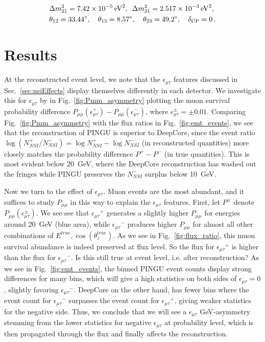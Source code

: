 \documentclass[draft=True]{revtex4-2}
\newcommand{\ztrue}{\ensuremath{\cos{(\theta_z^{true})}}}
\newcommand{\emt}{\ensuremath{\epsilon_{\mu\tau}}}
\newcommand{\Etrue}{E^{true}}
\newcommand{\dm}{\Delta m^2_{31}}
\begin{document}
\begin{align}\label{eq:PINGUparams}
    &\Delta m^2_{21} =  \SI{7.42e-5}{\electronvolt^2},\hspace{0.5em} \dm =  \SI{2.517e-3}{\electronvolt^2}, \nonumber \\
    &\theta_{12} = \SI{33.44}{\degree},\hspace{1em} \theta_{13} = \SI{8.57}{\degree},\hspace{1em} \theta_{23} = \SI{49.2}{\degree}, \hspace{1em} \delta_\text{CP} = 0\,.
\end{align}

\section{Results}
At the reconstructed event level, we note that the $\emt$ features discussed in Sec.~\ref{sec:nsiEffects} display themselves differently in each detector.
We investigate this for $\emt$ by in Fig.~\ref{fig:Pmm_asymmetry} plotting the muon survival probability difference $P_{\mu\mu}(\epsilon^+_{\mu\tau}) - P_{\mu\mu}(\epsilon^-_{\mu\tau})$, where 
$\epsilon^\pm_{\mu\tau} = \pm 0.01$.
Comparing Fig.~\ref{fig:Pmm_asymmetry} with the flux ratios in Fig.~\ref{fig:emt_events}, we see that the reconstruction of PINGU is
superior to DeepCore, since the event ratio $\log{(N^+_{NSI}/N^-_{NSI})} = \log{N^+_{NSI}} - \log{N^-_{NSI}}$ (in reconstructed quantities) 
more closely matches the probability difference $P^+-P^-$ (in true quantities).
This is most evident below \SI{20}{\GeV}, where the DeepCore reconstruction has washed out the fringes while PINGU preserves the $N^-_{NSI}$ surplus below \SI{10}{\GeV}.

Now we turn to the effect of $\emt$. Muon events are the most abundant, and it suffices to study $P_{\mu\mu}$ in this way to explain the $\emt$ features. 
First, let $P^\pm$ denote $P_{\mu\mu}(\epsilon^\pm_{\mu\tau})$. 
We see see that $\emt^+$ generates a slightly higher $P_{\mu\mu}$ for energies around \SI{20}{\GeV} (blue area),
while $\emt^-$ produces higher $P_{\mu\mu}$ for almost all other combinations of ${\Etrue,\ztrue}$. As we see in Fig.~\ref{fig:flux_ratio}, this muon survival abundance 
is indeed preserved at flux level. So the flux for $\emt^+$ is higher than the flux for $\emt^-$. Is this still true at event level, i.e. after reconstruction? 
As we see in Fig.~\ref{fig:emt_events}, the binned PINGU event counts display strong differences for many bins, which will give a high statistics on both sides of $\emt=0$, slightly favoring $\emt^-$. 
DeepCore on the other hand, has fewer bins where the event count for $\emt^-$ surpasses the event count for $\emt^+$, 
giving weaker statistics for the negative side. Thus, we conclude that we will see a $\emt$ \si{GeV}-asymmetry stemming from the lower statistics 
for negative $\emt$ at probability level, which is then propagated through the flux and finally affects the reconstruction. %
\end{document}
